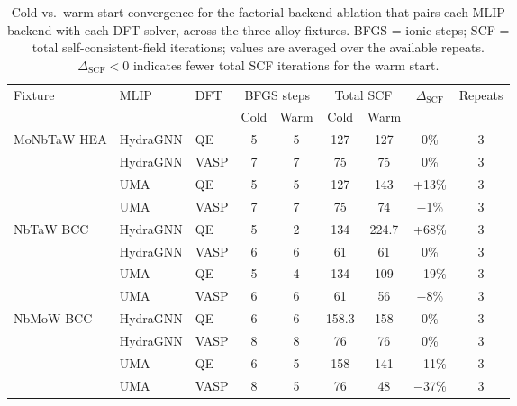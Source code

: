 \begin{table}[t]
\centering
\caption{Cold vs.\ warm-start convergence for the factorial backend ablation
that pairs each \acs{MLIP} backend with each \acs{DFT} solver, across the three
alloy fixtures. \acs{BFGS} = ionic steps; \acs{SCF} = total
self-consistent-field iterations; values are averaged over the available repeats.
$\Delta_\text{SCF}<0$ indicates fewer total \acs{SCF} iterations for the warm
start.}
\label{tab:warmstart_matrix}
\begin{tabular}{lllcccccc}
\toprule
\multirow{2}{*}{Fixture} & \multirow{2}{*}{\acs{MLIP}} & \multirow{2}{*}{\acs{DFT}}
 & \multicolumn{2}{c}{\acs{BFGS} steps} & \multicolumn{2}{c}{Total \acs{SCF}} & \multirow{2}{*}{$\Delta_\text{SCF}$} & \multirow{2}{*}{Repeats}\\
\cmidrule(lr){4-5}\cmidrule(lr){6-7}
 & & & Cold & Warm & Cold & Warm & & \\
\midrule
\multirow{4}{*}{MoNbTaW \acs{HEA}} & HydraGNN & \acs{QE} & 5 & 5 & 127 & 127 & 0\% & 3 \\
 & HydraGNN & \acs{VASP} & 7 & 7 & 75 & 75 & 0\% & 3 \\
 & UMA & \acs{QE} & 5 & 5 & 127 & 143 & +13\% & 3 \\
 & UMA & \acs{VASP} & 7 & 7 & 75 & 74 & $-$1\% & 3 \\
\cmidrule(lr){1-9}
\multirow{4}{*}{NbTaW BCC} & HydraGNN & \acs{QE} & 5 & 2 & 134 & 224.7 & +68\% & 3 \\
 & HydraGNN & \acs{VASP} & 6 & 6 & 61 & 61 & 0\% & 3 \\
 & UMA & \acs{QE} & 5 & 4 & 134 & 109 & $-$19\% & 3 \\
 & UMA & \acs{VASP} & 6 & 6 & 61 & 56 & $-$8\% & 3 \\
\cmidrule(lr){1-9}
\multirow{4}{*}{NbMoW BCC} & HydraGNN & \acs{QE} & 6 & 6 & 158.3 & 158 & 0\% & 3 \\
 & HydraGNN & \acs{VASP} & 8 & 8 & 76 & 76 & 0\% & 3 \\
 & UMA & \acs{QE} & 6 & 5 & 158 & 141 & $-$11\% & 3 \\
 & UMA & \acs{VASP} & 8 & 5 & 76 & 48 & $-$37\% & 3 \\
\bottomrule
\end{tabular}
\end{table}
